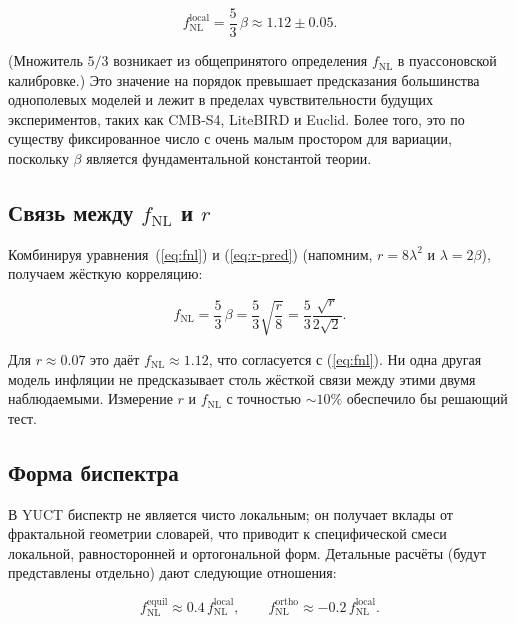 \documentclass[11pt,a4paper]{article}
\begin{document}
	\begin{equation}
		f_{\text{NL}}^{\text{local}} = \frac{5}{3}\,\beta \approx 1.12 \pm 0.05.
		\label{eq:fnl}
	\end{equation}
	
	(Множитель \(5/3\) возникает из общепринятого определения \(f_{\text{NL}}\) в пуассоновской калибровке.) Это значение на порядок превышает предсказания большинства однополевых моделей и лежит в пределах чувствительности будущих экспериментов, таких как CMB‑S4, LiteBIRD и Euclid. Более того, это по существу фиксированное число с очень малым простором для вариации, поскольку \(\beta\) является фундаментальной константой теории.
	
	\subsection{Связь между \(f_{\text{NL}}\) и \(r\)}
	
	Комбинируя уравнения~(\ref{eq:fnl}) и (\ref{eq:r-pred}) (напомним, \(r = 8\lambda^2\) и \(\lambda = 2\beta\)), получаем жёсткую корреляцию:
	
	\begin{equation}
		f_{\text{NL}} = \frac{5}{3}\,\beta = \frac{5}{3}\sqrt{\frac{r}{8}} = \frac{5}{3}\frac{\sqrt{r}}{2\sqrt{2}}.
		\label{eq:fnl-r}
	\end{equation}
	
	Для \(r \approx 0.07\) это даёт \(f_{\text{NL}} \approx 1.12\), что согласуется с (\ref{eq:fnl}). Ни одна другая модель инфляции не предсказывает столь жёсткой связи между этими двумя наблюдаемыми. Измерение \(r\) и \(f_{\text{NL}}\) с точностью \(\sim 10\%\) обеспечило бы решающий тест.
	
	\subsection{Форма биспектра}
	
	В YUCT биспектр не является чисто локальным; он получает вклады от фрактальной геометрии словарей, что приводит к специфической смеси локальной, равносторонней и ортогональной форм. Детальные расчёты (будут представлены отдельно) дают следующие отношения:
	
	\begin{equation}
		f_{\text{NL}}^{\text{equil}} \approx 0.4\, f_{\text{NL}}^{\text{local}}, \qquad
		f_{\text{NL}}^{\text{ortho}} \approx -0.2\, f_{\text{NL}}^{\text{local}}.
		\label{eq:fnl-shapes}
	\end{equation}
	
\end{document}
